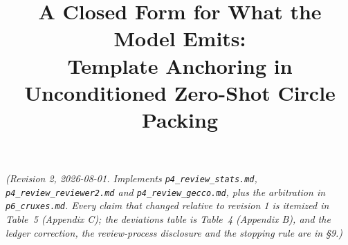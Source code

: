 \documentclass[11pt]{article}
\title{A Closed Form for What the Model Emits:\\ Template Anchoring in Unconditioned Zero-Shot Circle Packing}
\author{}
\date{}
\begin{document}
\maketitle

\begin{center}
\begin{minipage}{\dimexpr\linewidth-2cm\relax}
\small\itshape
(Revision 2, 2026-08-01. Implements \texttt{p4\_review\_stats.md}, \texttt{p4\_review\_reviewer2.md} and
\texttt{p4\_review\_gecco.md}, plus the arbitration in \texttt{p6\_cruxes.md}. Every claim that changed relative
to revision 1 is itemized in Table~5 (Appendix C); the deviations table is Table~4 (Appendix B),
and the ledger correction, the review-process disclosure and the stopping rule are in \S9.)
\end{minipage}
\end{center}
\end{document}
